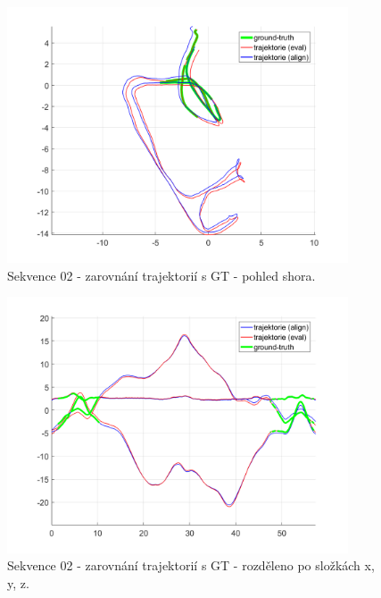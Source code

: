 \documentclass[12pt,a4paper]{article}
\begin{document}
\begin{figure}[H]
\centering
\includegraphics[width=0.9\textwidth]{img/m_dso_02_2.png}
\caption{Sekvence 02 - zarovnání trajektorií s GT - pohled shora.}
\end{figure}

\begin{figure}[H]
\centering
\includegraphics[width=0.9\textwidth]{img/m_dso_11_1.png}
\caption{Sekvence 02 - zarovnání trajektorií s GT - rozděleno po složkách x, y, z.}
\end{figure}
\end{document}
